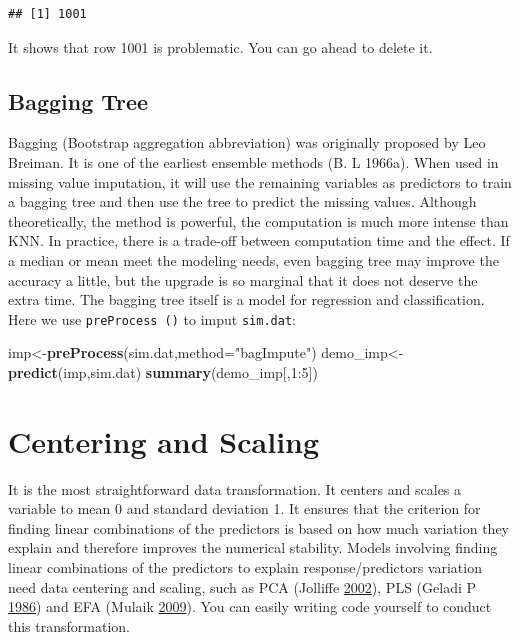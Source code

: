 \documentclass[]{book}
\newenvironment{Shaded}{\begin{snugshade}}{\end{snugshade}}
\newcommand{\KeywordTok}[1]{\textcolor[rgb]{0.13,0.29,0.53}{\textbf{{#1}}}}
\newcommand{\DataTypeTok}[1]{\textcolor[rgb]{0.13,0.29,0.53}{{#1}}}
\newcommand{\DecValTok}[1]{\textcolor[rgb]{0.00,0.00,0.81}{{#1}}}
\newcommand{\StringTok}[1]{\textcolor[rgb]{0.31,0.60,0.02}{{#1}}}
\newcommand{\NormalTok}[1]{{#1}}
\theoremstyle{definition}
\theoremstyle{definition}
\theoremstyle{remark}
\begin{document}
\begin{verbatim}
## [1] 1001
\end{verbatim}

It shows that row 1001 is problematic. You can go ahead to delete it.

\subsection{Bagging Tree}\label{bagging-tree}

Bagging (Bootstrap aggregation abbreviation) was originally proposed by
Leo Breiman. It is one of the earliest ensemble methods (B. L 1966a).
When used in missing value imputation, it will use the remaining
variables as predictors to train a bagging tree and then use the tree to
predict the missing values. Although theoretically, the method is
powerful, the computation is much more intense than KNN. In practice,
there is a trade-off between computation time and the effect. If a
median or mean meet the modeling needs, even bagging tree may improve
the accuracy a little, but the upgrade is so marginal that it does not
deserve the extra time. The bagging tree itself is a model for
regression and classification. Here we use \texttt{preProcess\ ()} to
imput \texttt{sim.dat}:

\begin{Shaded}
\begin{Highlighting}[]
\NormalTok{imp<-}\KeywordTok{preProcess}\NormalTok{(sim.dat,}\DataTypeTok{method=}\StringTok{"bagImpute"}\NormalTok{)}
\NormalTok{demo_imp<-}\KeywordTok{predict}\NormalTok{(imp,sim.dat)}
\KeywordTok{summary}\NormalTok{(demo_imp[,}\DecValTok{1}\NormalTok{:}\DecValTok{5}\NormalTok{])}
\end{Highlighting}
\end{Shaded}

\section{Centering and Scaling}\label{centering-and-scaling}

It is the most straightforward data transformation. It centers and
scales a variable to mean 0 and standard deviation 1. It ensures that
the criterion for finding linear combinations of the predictors is based
on how much variation they explain and therefore improves the numerical
stability. Models involving finding linear combinations of the
predictors to explain response/predictors variation need data centering
and scaling, such as PCA (Jolliffe \protect\hyperlink{ref-pca1}{2002}),
PLS (Geladi P \protect\hyperlink{ref-PLS1}{1986}) and EFA (Mulaik
\protect\hyperlink{ref-EFA1}{2009}). You can easily writing code
yourself to conduct this transformation.
\end{document}
